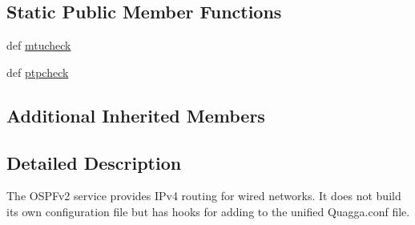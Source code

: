 \subsection*{Static Public Member Functions}
\begin{DoxyCompactItemize}
\item 
def \hyperlink{classcore_1_1services_1_1quagga_1_1_ospfv2_a38ffdb04b3cda17f79b993fc77a3859f}{mtucheck}
\item 
def \hyperlink{classcore_1_1services_1_1quagga_1_1_ospfv2_a267de8a7b2563ceb2dfde5bd654e5ba6}{ptpcheck}
\end{DoxyCompactItemize}
\subsection*{Additional Inherited Members}


\subsection{Detailed Description}
\begin{DoxyVerb}The OSPFv2 service provides IPv4 routing for wired networks. It does
    not build its own configuration file but has hooks for adding to the
    unified Quagga.conf file.
\end{DoxyVerb}
 


